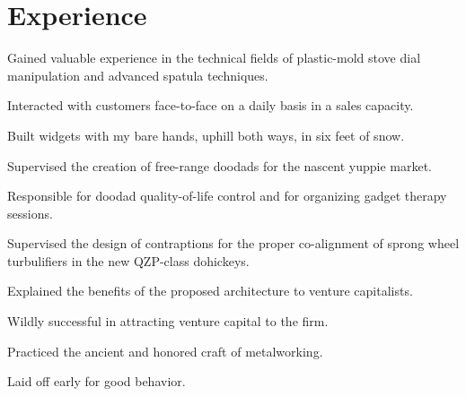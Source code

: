 \documentclass[letterpaper]{resume}
\begin{document}
\section{Experience}


\begin{compactitem}
\item Gained valuable experience in the technical fields of
  plastic-mold stove dial manipulation and advanced spatula
  techniques.
\item Interacted with customers face-to-face on a daily basis in a
  sales capacity.
\end{compactitem}


\begin{compactitem}
\item Built widgets with my bare hands, uphill both ways, in six feet
  of snow.
\end{compactitem}


\begin{compactitem}
\item Supervised the creation of free-range doodads for the nascent
  yuppie market.
\item Responsible for doodad quality-of-life control and for
  organizing gadget therapy sessions.
\end{compactitem}

\begin{compactitem}
\item Supervised the design of contraptions for the proper
  co-alignment of sprong wheel turbulifiers in the new QZP-class
  dohickeys.
\item Explained the benefits of the proposed architecture to venture
  capitalists.
\item Wildly successful in attracting venture capital to the firm.
\end{compactitem}

\begin{compactitem}
\item Practiced the ancient and honored craft of metalworking.
\item Laid off early for good behavior.
\end{compactitem}
\end{document}

